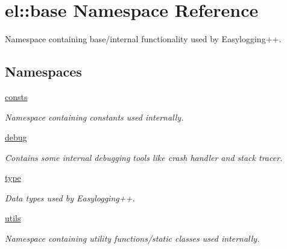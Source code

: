 \hypertarget{namespaceel_1_1base}{\section{el\-:\-:base Namespace Reference}
\label{namespaceel_1_1base}
}


Namespace containing base/internal functionality used by Easylogging++.  


\subsection*{Namespaces}
\begin{DoxyCompactItemize}
\item 
\hyperlink{namespaceel_1_1base_1_1consts}{consts}
\begin{DoxyCompactList}\small\item\em Namespace containing constants used internally. \end{DoxyCompactList}\item 
\hyperlink{namespaceel_1_1base_1_1debug}{debug}
\begin{DoxyCompactList}\small\item\em Contains some internal debugging tools like crash handler and stack tracer. \end{DoxyCompactList}\item 
\hyperlink{namespaceel_1_1base_1_1type}{type}
\begin{DoxyCompactList}\small\item\em Data types used by Easylogging++. \end{DoxyCompactList}\item 
\hyperlink{namespaceel_1_1base_1_1utils}{utils}
\begin{DoxyCompactList}\small\item\em Namespace containing utility functions/static classes used internally. \end{DoxyCompactList}\end{DoxyCompactItemize}
